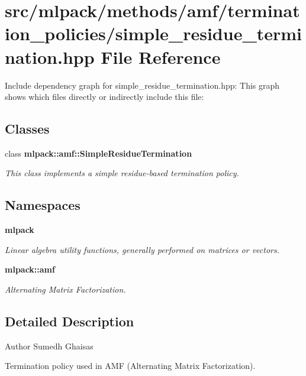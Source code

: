 \section{src/mlpack/methods/amf/termination\-\_\-policies/simple\-\_\-residue\-\_\-termination.hpp File Reference}
\label{simple__residue__termination_8hpp}
Include dependency graph for simple\-\_\-residue\-\_\-termination.\-hpp\-:
This graph shows which files directly or indirectly include this file\-:
\subsection*{Classes}
\begin{DoxyCompactItemize}
\item 
class {\bf mlpack\-::amf\-::\-Simple\-Residue\-Termination}
\begin{DoxyCompactList}\small\item\em This class implements a simple residue-\/based termination policy. \end{DoxyCompactList}\end{DoxyCompactItemize}
\subsection*{Namespaces}
\begin{DoxyCompactItemize}
\item 
{\bf mlpack}
\begin{DoxyCompactList}\small\item\em Linear algebra utility functions, generally performed on matrices or vectors. \end{DoxyCompactList}\item 
{\bf mlpack\-::amf}
\begin{DoxyCompactList}\small\item\em Alternating Matrix Factorization. \end{DoxyCompactList}\end{DoxyCompactItemize}


\subsection{Detailed Description}
\begin{DoxyAuthor}{Author}
Sumedh Ghaisas
\end{DoxyAuthor}
Termination policy used in A\-M\-F (Alternating Matrix Factorization).

